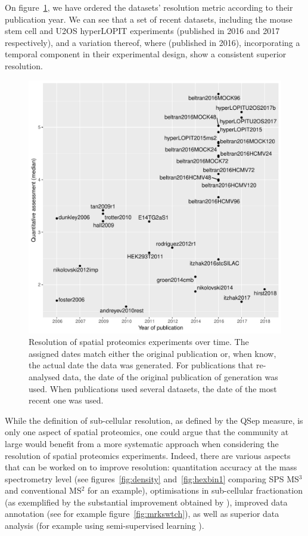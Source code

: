 \documentclass[12pt]{article}\usepackage[]{graphicx}\usepackage[]{color}
\newenvironment{knitrout}{}{} %
\begin{document}
On figure~\ref{fig:restime}, we have ordered the datasets' resolution
metric according to their publication year. We can see that a set of
recent datasets, including the mouse stem cell
\citep{Christoforou:2016} and U2OS \citep{Thul:2017} hyperLOPIT
experiments (published in 2016 and 2017 respectively), and a variation
thereof, where \citet{JeanBeltran:2016} (published in 2016),
incorporating a temporal component in their experimental design, show
a consistent superior resolution.

\begin{figure}[h]
  \centering
\begin{knitrout}
\color{fgcolor}
\includegraphics[width=0.8\linewidth]{figure/restime-1} 

\end{knitrout}
\caption{Resolution of spatial proteomics experiments over time. The
  assigned dates match either the original publication or, when know,
  the actual date the data was generated. For publications that
  re-analysed data, the date of the original publication of generation
  was used. When publications used several datasets, the date of the
  most recent one was used.}
  \label{fig:restime}
\end{figure}


While the definition of sub-cellular resolution, as defined by the
QSep measure, is only one aspect of spatial proteomics, one could
argue that the community at large would benefit from a more systematic
approach when considering the resolution of spatial proteomics
experiments. Indeed, there are various aspects that can be worked on
to improve resolution: quantitation accuracy at the mass spectrometry
level (see figures~\ref{fig:density} and~\ref{fig:hexbin1} comparing
SPS MS$^3$ and conventional MS$^2$ for an example), optimisations in
sub-cellular fractionation (as exemplified by the substantial
improvement obtained by \citep{Christoforou:2016}), improved data
annotation (see for example figure~\ref{fig:mrkswtch}), as well as
superior data analysis (for example using semi-supervised learning
\citet{Breckels:2013}).
\end{document}
